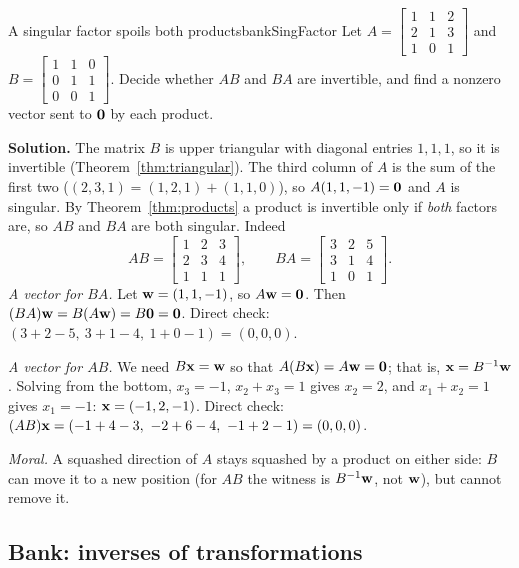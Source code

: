 \documentclass[11pt]{article}
\begin{document}
\begin{exmp}{A singular factor spoils both products}{bankSingFactor}
Let $A=\begin{bmatrix}1&1&2\\2&1&3\\1&0&1\end{bmatrix}$ and $B=\begin{bmatrix}1&1&0\\0&1&1\\0&0&1\end{bmatrix}$. Decide whether $AB$ and $BA$ are invertible, and find a nonzero vector sent to $\mathbf{0}$ by each product.

\textbf{Solution.} The matrix $B$ is upper triangular with diagonal entries $1,1,1$, so it is invertible (Theorem~\ref{thm:triangular}). The third column of $A$ is the sum of the first two ($(2,3,1)=(1,2,1)+(1,1,0)$), so $A(1,1,-1)=\mathbf{0}$ and $A$ is singular. By Theorem~\ref{thm:products} a product is invertible only if \emph{both} factors are, so $AB$ and $BA$ are both singular. Indeed
\[
AB=\begin{bmatrix}1&2&3\\2&3&4\\1&1&1\end{bmatrix},\qquad BA=\begin{bmatrix}3&2&5\\3&1&4\\1&0&1\end{bmatrix}.
\]
\emph{A vector for $BA$.} Let $\mathbf{w}=(1,1,-1)$, so $A\mathbf{w}=\mathbf{0}$. Then $(BA)\mathbf{w}=B(A\mathbf{w})=B\mathbf{0}=\mathbf{0}$. Direct check: $(3+2-5,\ 3+1-4,\ 1+0-1)=(0,0,0)$.

\emph{A vector for $AB$.} We need $B\mathbf{x}=\mathbf{w}$ so that $A(B\mathbf{x})=A\mathbf{w}=\mathbf{0}$; that is, $\mathbf{x}=B^{-1}\mathbf{w}$. Solving from the bottom, $x_3=-1$, $x_2+x_3=1$ gives $x_2=2$, and $x_1+x_2=1$ gives $x_1=-1$: $\mathbf{x}=(-1,2,-1)$. Direct check: $(AB)\bv{x}=(-1+4-3,\ -2+6-4,\ -1+2-1)=(0,0,0)$.

\emph{Moral.} A squashed direction of $A$ stays squashed by a product on either side: $B$ can move it to a new position (for $AB$ the witness is $B^{-1}\mathbf{w}$, not $\mathbf{w}$), but cannot remove it.
\end{exmp}

\subsection*{Bank: inverses of transformations}
\end{document}
